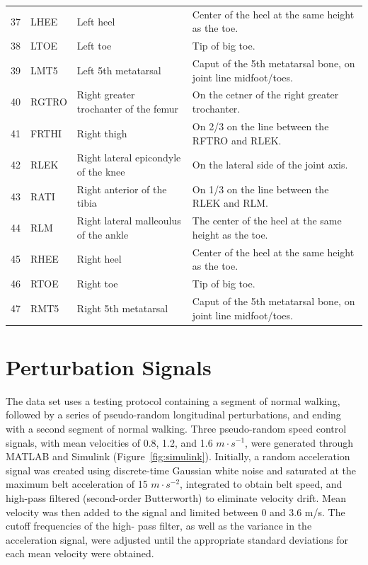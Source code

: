 \documentclass{article}
\begin{document}
\begin{table}
\begin{tabular}{rlll}
    37 & LHEE  & Left heel                             & Center of the heel at the same height as the toe. \\
    38 & LTOE  & Left toe                              & Tip of big toe. \\
    39 & LMT5  & Left 5th metatarsal                   & Caput of the 5th metatarsal bone, on joint line midfoot/toes. \\
    40 & RGTRO & Right greater trochanter of the femur & On the cetner of the right greater trochanter. \\
    41 & FRTHI & Right thigh                           & On 2/3 on the line between the RFTRO and RLEK. \\
    42 & RLEK  & Right lateral epicondyle of the knee  & On the lateral side of the joint axis. \\
    43 & RATI  & Right anterior of the tibia           & On 1/3 on the line between the RLEK and RLM. \\
    44 & RLM   & Right lateral malleoulus of the ankle & The center of the heel at the same height as the toe. \\
    45 & RHEE  & Right heel                            & Center of the heel at the same height as the toe. \\
    46 & RTOE  & Right toe                             & Tip of big toe. \\
    47 & RMT5  & Right 5th metatarsal                  & Caput of the 5th metatarsal bone, on joint line midfoot/toes. \\
    \bottomrule
  \end{tabular}
  \label{tab:marker-labels}
\end{table}

\section{Perturbation Signals}
%
The data set uses a testing protocol containing a segment of normal walking,
followed by a series of pseudo-random longitudinal perturbations, and ending
with a second segment of normal walking. Three pseudo-random speed control
signals, with mean velocities of 0.8, 1.2, and 1.6 $m \cdot s^{-1}$, were
generated through MATLAB and Simulink (Figure~\ref{fig:simulink}). Initially, a 
random acceleration signal was created using discrete-time Gaussian white 
noise and saturated at the maximum belt acceleration of 15 $m \cdot s^{-2}$,
integrated to obtain belt speed, and high-pass filtered (second-order
Butterworth) to eliminate velocity drift. Mean velocity was then added to the 
signal and limited between 0 and 3.6 m/s. The cutoff frequencies of the high-
pass filter, as well as the variance in the acceleration signal, were adjusted 
until the appropriate standard deviations for each mean velocity were obtained.
\end{document}

